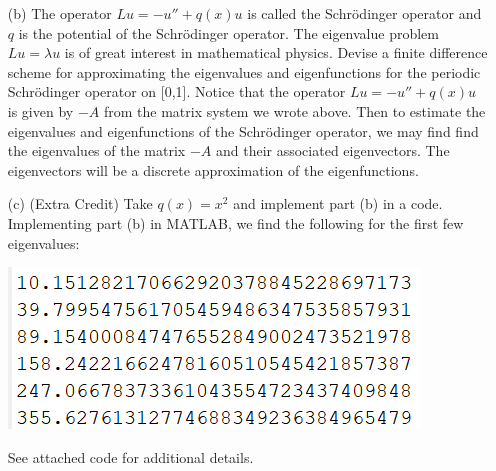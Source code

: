 \documentclass{article}
\begin{document}
\begin{itemize}
    
    \item[(b)] The operator $Lu = -u'' + q(x)u$ is called the Schr\"odinger operator and $q$ is the potential of the Schr\"odinger operator. 
    The eigenvalue problem $Lu = \lambda u$ is of great interest in mathematical physics. 
    Devise a finite difference scheme for approximating the eigenvalues and eigenfunctions for the periodic Schr\"odinger operator on [0,1].
    \newline\newline
    Notice that the operator $Lu = -u'' + q(x)u$ is given by $-A$ from the matrix system we wrote above. 
    Then to estimate the eigenvalues and eigenfunctions of the Schr\"odinger operator, we may find find the eigenvalues of the matrix $-A$ and their associated eigenvectors. 
    The eigenvectors will be a discrete approximation of the eigenfunctions.
    
    \item[(c)] (Extra Credit) Take $q(x) = x^2$ and implement part (b) in a code.
    Implementing part (b) in MATLAB, we find the following for the first few eigenvalues:
    \begin{center}
        \includegraphics[scale = 0.7]{firstEigenValues.png}
    \end{center}
    See attached code for additional details.
\end{itemize}
\end{document}
